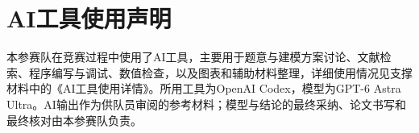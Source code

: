 \section*{AI工具使用声明}
本参赛队在竞赛过程中使用了AI工具，主要用于题意与建模方案讨论、文献检索、程序编写与调试、数值检查，以及图表和辅助材料整理，详细使用情况见支撑材料中的《AI工具使用详情》。所用工具为OpenAI Codex，模型为GPT-6 Astra Ultra。AI输出作为供队员审阅的参考材料；模型与结论的最终采纳、论文书写和最终核对由本参赛队负责。
